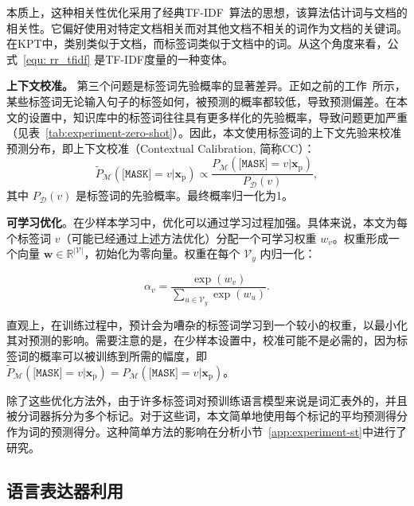 本质上，这种相关性优化采用了经典TF-IDF~\cite{jones1972statistical}算法的思想，该算法估计词与文档的相关性。它偏好使用对特定文档相关而对其他文档不相关的词作为文档的关键词。在KPT中，类别类似于文档，而标签词类似于文档中的词。从这个角度来看，公式~\eqref{equ: rr_tfidf} 是TF-IDF度量的一种变体。 


\textbf{上下文校准。}\quad
\label{sec: refine-CC}
第三个问题是标签词先验概率的显著差异。正如之前的工作~\cite{pmlr-v139-zhao21c, holtzman2021surface}所示，某些标签词无论输入句子的标签如何，被预测的概率都较低，导致预测偏差。在本文的设置中，知识库中的标签词往往具有更多样化的先验概率，导致问题更加严重（见表~\ref{tab:experiment-zero-shot}）。因此，本文使用标签词的上下文先验来校准预测分布，即上下文校准（Contextual Calibration, 简称CC）：
\begin{equation}
    \tilde{P}_{\mathcal{M}}(\!\texttt{[MASK]}\!\!\!=\!v|\mathbf{x}_{\text{p}}) \!\propto\! \frac{P_{\mathcal{M}}(\!\texttt{[MASK]}\!\!\!=\!v|\mathbf{x}_{\text{p}})}{P_{\mathcal{D}}(v)},
\end{equation}
其中 $P_{\mathcal{D}}(v)$ 是标签词的先验概率。最终概率归一化为1。

\textbf{可学习优化}。在少样本学习中，优化可以通过学习过程加强。具体来说，本文为每个标签词 $v$（可能已经通过上述方法优化）分配一个可学习权重 $w_v$。权重形成一个向量 $\mathbf{w}\in \mathbb{R}^{|\mathcal{V}|}$，初始化为零向量。权重在每个 $\mathcal{V}_y$ 内归一化：

\begin{equation}
    \alpha_v = \frac{\operatorname{exp}(w_v)}{\sum_{u\in \mathcal{V}_y} \operatorname{exp}(w_u)}.
\end{equation}

直观上，在训练过程中，预计会为嘈杂的标签词学习到一个较小的权重，以最小化其对预测的影响。需要注意的是，在少样本设置中，校准可能不是必需的，因为标签词的概率可以被训练到所需的幅度，即 $\tilde{P}_{\mathcal{M}}(\texttt{[MASK]}\!\!\!=\!v|\mathbf{x}_{\text{p}}) ={P_{\mathcal{M}}(\texttt{[MASK]}\!\!\!=\!v|\mathbf{x}_{\text{p}})}$。

除了这些优化方法外，由于许多标签词对预训练语言模型来说是词汇表外的，并且被分词器拆分为多个标记。对于这些词，本文简单地使用每个标记的平均预测得分作为词的预测得分。这种简单方法的影响在分析小节~\ref{app:experiment-st}中进行了研究。

\subsection{语言表达器利用}
\label{sec:use}

